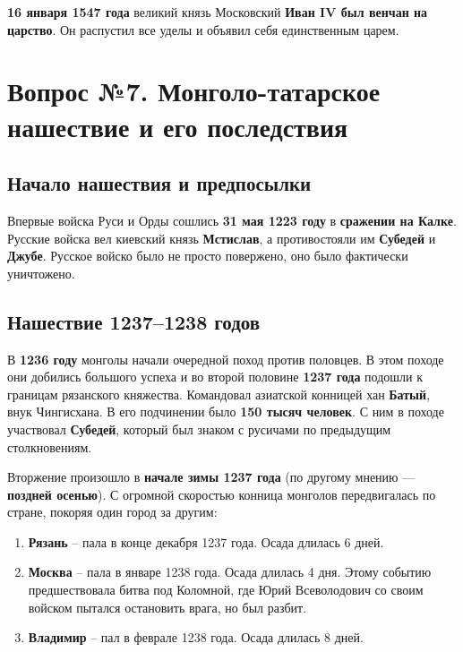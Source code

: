 \documentclass{article}
\begin{document}
\hfill

\textbf{16 января 1547 года} великий князь Московский \textbf{Иван IV был венчан на царство}. Он распустил все уделы и объявил себя единственным царем.

\pagebreak
\section{Вопрос №7. Монголо-татарское нашествие и его последствия}

\subsection{Начало нашествия и предпосылки}

Впервые войска Руси и Орды сошлись \textbf{31 мая 1223 году} в \textbf{сражении на Калке}. Русские войска вел киевский князь \textbf{Мстислав}, а противостояли им \textbf{Субедей} и \textbf{Джубе}. Русское войско было не просто повержено, оно было фактически уничтожено.

\subsection{Нашествие 1237–1238 годов}

В \textbf{1236 году} монголы начали очередной поход против половцев. В этом походе они добились большого успеха и во второй половине \textbf{1237 года} подошли к границам рязанского княжества.  Командовал азиатской конницей хан \textbf{Батый}, внук Чингисхана. В его подчинении было \textbf{150 тысяч человек}. С ним в походе участвовал \textbf{Субедей}, который был знаком с русичами по предыдущим столкновениям.

\hfill

Вторжение произошло в \textbf{начале зимы 1237 года} (по другому мнению — \textbf{поздней осенью}). С огромной скоростью конница монголов передвигалась по стране, покоряя один город за другим:

\begin{enumerate}
    \item \textbf{Рязань} – пала в конце декабря 1237 года. Осада длилась 6 дней.
    \item \textbf{Москва} – пала в январе 1238 года. Осада длилась 4 дня. Этому событию предшествовала битва под Коломной, где Юрий Всеволодович со своим войском пытался остановить врага, но был разбит.
    \item \textbf{Владимир} – пал в феврале 1238 года. Осада длилась 8 дней. 
\end{enumerate}
\end{document}
